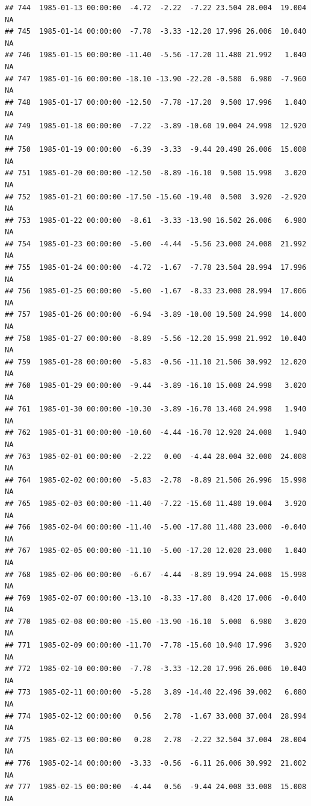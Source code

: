 \documentclass{article}\usepackage{graphicx, color}
\makeatletter
\newenvironment{kframe}{%
 \def\at@end@of@kframe{}%
 \ifinner\ifhmode%
  \def\at@end@of@kframe{\end{minipage}}%
  \begin{minipage}{\columnwidth}%
 \fi\fi%
 \def\FrameCommand##1{\hskip\@totalleftmargin \hskip-\fboxsep
 \colorbox{shadecolor}{##1}\hskip-\fboxsep
     \hskip-\linewidth \hskip-\@totalleftmargin \hskip\columnwidth}%
 \MakeFramed {\advance\hsize-\width
   \@totalleftmargin\z@ \linewidth\hsize
   \@setminipage}}%
 {\par\unskip\endMakeFramed%
 \at@end@of@kframe}
\newenvironment{knitrout}{}{} %
\makeatother
\begin{document}
\begin{knitrout}
\begin{kframe}
\begin{verbatim}
## 744  1985-01-13 00:00:00  -4.72  -2.22  -7.22 23.504 28.004  19.004     NA
## 745  1985-01-14 00:00:00  -7.78  -3.33 -12.20 17.996 26.006  10.040     NA
## 746  1985-01-15 00:00:00 -11.40  -5.56 -17.20 11.480 21.992   1.040     NA
## 747  1985-01-16 00:00:00 -18.10 -13.90 -22.20 -0.580  6.980  -7.960     NA
## 748  1985-01-17 00:00:00 -12.50  -7.78 -17.20  9.500 17.996   1.040     NA
## 749  1985-01-18 00:00:00  -7.22  -3.89 -10.60 19.004 24.998  12.920     NA
## 750  1985-01-19 00:00:00  -6.39  -3.33  -9.44 20.498 26.006  15.008     NA
## 751  1985-01-20 00:00:00 -12.50  -8.89 -16.10  9.500 15.998   3.020     NA
## 752  1985-01-21 00:00:00 -17.50 -15.60 -19.40  0.500  3.920  -2.920     NA
## 753  1985-01-22 00:00:00  -8.61  -3.33 -13.90 16.502 26.006   6.980     NA
## 754  1985-01-23 00:00:00  -5.00  -4.44  -5.56 23.000 24.008  21.992     NA
## 755  1985-01-24 00:00:00  -4.72  -1.67  -7.78 23.504 28.994  17.996     NA
## 756  1985-01-25 00:00:00  -5.00  -1.67  -8.33 23.000 28.994  17.006     NA
## 757  1985-01-26 00:00:00  -6.94  -3.89 -10.00 19.508 24.998  14.000     NA
## 758  1985-01-27 00:00:00  -8.89  -5.56 -12.20 15.998 21.992  10.040     NA
## 759  1985-01-28 00:00:00  -5.83  -0.56 -11.10 21.506 30.992  12.020     NA
## 760  1985-01-29 00:00:00  -9.44  -3.89 -16.10 15.008 24.998   3.020     NA
## 761  1985-01-30 00:00:00 -10.30  -3.89 -16.70 13.460 24.998   1.940     NA
## 762  1985-01-31 00:00:00 -10.60  -4.44 -16.70 12.920 24.008   1.940     NA
## 763  1985-02-01 00:00:00  -2.22   0.00  -4.44 28.004 32.000  24.008     NA
## 764  1985-02-02 00:00:00  -5.83  -2.78  -8.89 21.506 26.996  15.998     NA
## 765  1985-02-03 00:00:00 -11.40  -7.22 -15.60 11.480 19.004   3.920     NA
## 766  1985-02-04 00:00:00 -11.40  -5.00 -17.80 11.480 23.000  -0.040     NA
## 767  1985-02-05 00:00:00 -11.10  -5.00 -17.20 12.020 23.000   1.040     NA
## 768  1985-02-06 00:00:00  -6.67  -4.44  -8.89 19.994 24.008  15.998     NA
## 769  1985-02-07 00:00:00 -13.10  -8.33 -17.80  8.420 17.006  -0.040     NA
## 770  1985-02-08 00:00:00 -15.00 -13.90 -16.10  5.000  6.980   3.020     NA
## 771  1985-02-09 00:00:00 -11.70  -7.78 -15.60 10.940 17.996   3.920     NA
## 772  1985-02-10 00:00:00  -7.78  -3.33 -12.20 17.996 26.006  10.040     NA
## 773  1985-02-11 00:00:00  -5.28   3.89 -14.40 22.496 39.002   6.080     NA
## 774  1985-02-12 00:00:00   0.56   2.78  -1.67 33.008 37.004  28.994     NA
## 775  1985-02-13 00:00:00   0.28   2.78  -2.22 32.504 37.004  28.004     NA
## 776  1985-02-14 00:00:00  -3.33  -0.56  -6.11 26.006 30.992  21.002     NA
## 777  1985-02-15 00:00:00  -4.44   0.56  -9.44 24.008 33.008  15.008     NA

\end{verbatim}
\end{kframe}
\end{knitrout}
\end{document}
